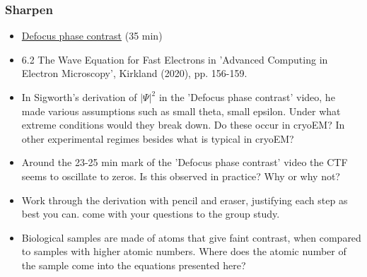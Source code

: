 \documentclass[11pt, oneside]{article}   	%
\begin{document}
\subsubsection{Sharpen}
\begin{itemize}
	\item \href{https://youtu.be/m2Hm1ziZFZg}{Defocus phase contrast} (35 min)
	\item 6.2 The Wave Equation for Fast Electrons in 'Advanced Computing in Electron Microscopy', Kirkland (2020), pp. 156-159.
\end{itemize}
\begin{itemize}
\item In Sigworth's derivation of $|\Psi|^2$ in the 'Defocus phase contrast' video, he made various assumptions such as small theta, small epsilon. Under what extreme conditions would they break down. Do these occur in cryoEM? In other experimental regimes besides what is typical in cryoEM?
\item Around the 23-25 min mark of the 'Defocus phase contrast' video the CTF seems to oscillate to zeros. Is this observed in practice? Why or why not?
\item Work through the derivation with pencil and eraser, justifying each step as best you can. come with your questions to the group study.
\item Biological samples are made of atoms that give faint contrast, when compared to samples with higher atomic numbers. Where does the atomic number of the sample come into the equations presented here? 
\end{itemize}
\end{document}
